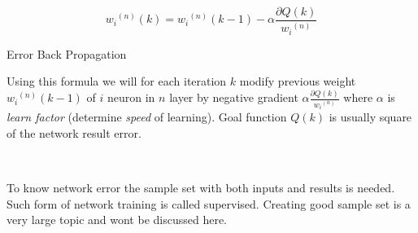 \begin{mycapequ}[!ht]
    $$ {w_i}^{(n)}(k) = {w_i}^{(n)}(k-1)-\alpha\frac{\partial Q(k)}{{w_i}^{(n)}} $$
    \caption{Error Back Propagation}
    \label{formula:EBP}
\end{mycapequ}

Using this formula we will for each iteration $k$ modify previous weight ${w_i}^{(n)}(k-1)$ of $i$ neuron in $n$ layer by negative gradient $\displaystyle{\alpha\frac{\partial Q(k)}{{w_i}^{(n)}}}$ where $\alpha$ is \textit{learn factor} (determine \textit{speed} of learning).
Goal function $Q(k)$ is usually square of the network result error.

\ 


To know network error the sample set with both inputs and results is needed. Such form of network training is called supervised. Creating good sample set is a very large topic and wont be discussed here.
